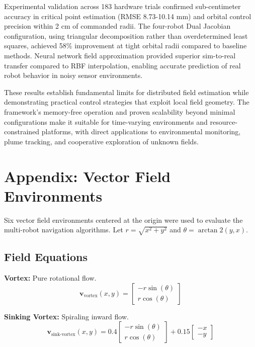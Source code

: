 \documentclass[lettersize,journal]{IEEEtran}
\begin{document}
Experimental validation across 183 hardware trials confirmed sub-centimeter accuracy in critical point estimation (RMSE 8.73-10.14 mm) and orbital control precision within 2 cm of commanded radii. The four-robot Dual Jacobian configuration, using triangular decomposition rather than overdetermined least squares, achieved 58\% improvement at tight orbital radii compared to baseline methods. Neural network field approximation provided superior sim-to-real transfer compared to RBF interpolation, enabling accurate prediction of real robot behavior in noisy sensor environments.

These results establish fundamental limits for distributed field estimation while demonstrating practical control strategies that exploit local field geometry. The framework's memory-free operation and proven scalability beyond minimal configurations make it suitable for time-varying environments and resource-constrained platforms, with direct applications to environmental monitoring, plume tracking, and cooperative exploration of unknown fields.



\section{Appendix: Vector Field Environments}
\label{sec:appendix_vector_fields}

Six vector field environments centered at the origin were used to evaluate the multi-robot navigation algorithms. Let $r = \sqrt{x^2 + y^2}$ and $\theta = \arctan2(y, x)$.

\subsection{Field Equations}

\textbf{Vortex:} Pure rotational flow.
\begin{equation}
\mathbf{v}_{\text{vortex}}(x, y) = \begin{bmatrix} -r \sin(\theta) \\ r \cos(\theta) \end{bmatrix}
\end{equation}

\textbf{Sinking Vortex:} Spiraling inward flow.
\begin{equation}
\mathbf{v}_{\text{sink-vortex}}(x, y) = 0.4 \begin{bmatrix} -r \sin(\theta) \\ r \cos(\theta) \end{bmatrix} + 0.15 \begin{bmatrix} -x \\ -y \end{bmatrix}
\end{equation}
\end{document}
